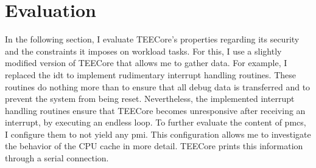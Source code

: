 \chapter{Evaluation}
\label{sec:evaluation}


In the following section, I evaluate TEECore's properties regarding its security
and the constraints it imposes on workload tasks. For this, I use a slightly
modified version of TEECore that allows me to gather data. For example, I
replaced the \gls{idt} to implement rudimentary interrupt handling routines.
These routines do nothing more than to ensure that all debug data is transferred
and to prevent the system from being reset. Nevertheless, the implemented
interrupt handling routines ensure that TEECore becomes unresponsive after
receiving an interrupt, by executing an endless loop. To further evaluate the
content of \glspl{pmc}, I configure them to not yield any \gls{pmi}. This
configuration allows me to investigate the behavior of the CPU cache in more
detail. TEECore prints this information through a serial connection.

